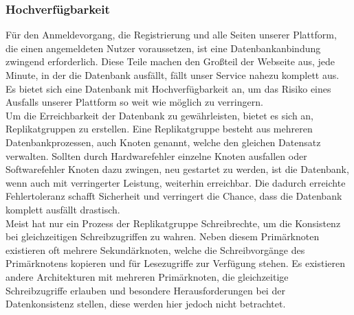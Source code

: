 \subsubsection{Hochverfügbarkeit}
Für den Anmeldevorgang, die Registrierung und alle Seiten unserer Plattform, die einen angemeldeten Nutzer voraussetzen, ist eine Datenbankanbindung zwingend erforderlich. Diese Teile machen den Großteil der Webseite aus, jede Minute, in der die Datenbank ausfällt, fällt unser Service nahezu komplett aus. Es bietet sich eine Datenbank mit Hochverfügbarkeit an, um das Risiko eines Ausfalls unserer Plattform so weit wie möglich zu verringern.\\
Um die Erreichbarkeit der Datenbank zu gewährleisten, bietet es sich an, Replikatgruppen zu erstellen. Eine Replikatgruppe besteht aus mehreren Datenbankprozessen, auch Knoten genannt, welche den gleichen Datensatz verwalten. Sollten durch Hardwarefehler einzelne Knoten ausfallen oder Softwarefehler Knoten dazu zwingen, neu gestartet zu werden, ist die Datenbank, wenn auch mit verringerter Leistung, weiterhin erreichbar. Die dadurch erreichte Fehlertoleranz schafft Sicherheit und verringert die Chance, dass die Datenbank komplett ausfällt drastisch.\\
Meist hat nur ein Prozess der Replikatgruppe Schreibrechte, um die Konsistenz bei gleichzeitigen Schreibzugriffen zu wahren. Neben diesem Primärknoten existieren oft mehrere Sekundärknoten, welche die Schreibvorgänge des Primärknotens kopieren und für Lesezugriffe zur Verfügung stehen. Es existieren andere Architekturen mit mehreren Primärknoten, die gleichzeitige Schreibzugriffe erlauben und besondere Herausforderungen bei der Datenkonsistenz stellen, diese werden hier jedoch nicht betrachtet.


